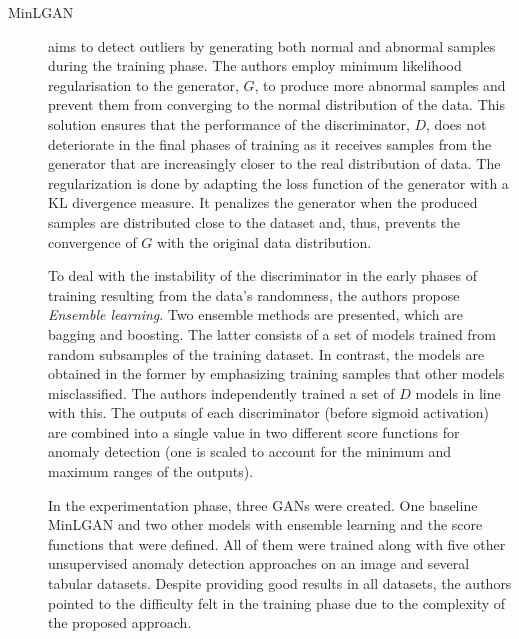 \begin{description}
    \item[MinLGAN \cite{wang.etal_AnomalyDetectionMinimum_2018}] aims to detect outliers by generating both normal and abnormal samples during the training phase. The authors employ minimum likelihood regularisation to the generator, $G$, to produce more abnormal samples and prevent them from converging to the normal distribution of the data. This solution ensures that the performance of the discriminator, $D$, does not deteriorate in the final phases of training as it receives samples from the generator that are increasingly closer to the real distribution of data. The regularization is done by adapting the loss function of the generator with a KL divergence measure. It penalizes the generator when the produced samples are distributed close to the dataset and, thus, prevents the convergence of $G$ with the original data distribution. 

    To deal with the instability of the discriminator in the early phases of training resulting from the data's randomness, the authors propose \textit{Ensemble learning}. Two ensemble methods are presented, which are bagging and boosting. The latter consists of a set of models trained from random subsamples of the training dataset. In contrast, the models are obtained in the former by emphasizing training samples that other models misclassified. The authors independently trained a set of $D$ models in line with this. The outputs of each discriminator (before sigmoid activation) are combined into a single value in two different score functions for anomaly detection (one is scaled to account for the minimum and maximum ranges of the outputs).

    In the experimentation phase, three GANs were created. One baseline MinLGAN and two other models with ensemble learning and the score functions that were defined. All of them were trained along with five other unsupervised anomaly detection approaches on an image and several tabular datasets. Despite providing good results in all datasets, the authors pointed to the difficulty felt in the training phase due to the complexity of the proposed approach.
\end{description}

